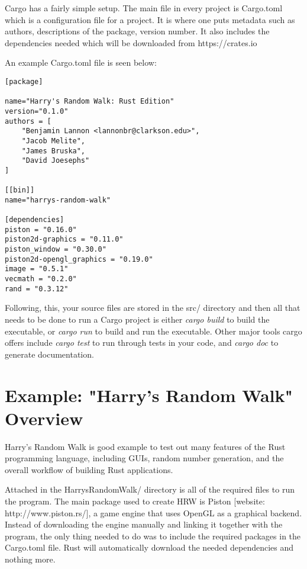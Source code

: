\documentclass{article}
\begin{document}
Cargo has a fairly simple setup. The main file in every project is Cargo.toml which is a configuration file for a project. It is where one puts metadata such as authors, descriptions of the package, version number. It also includes the dependencies needed which will be downloaded from https://crates.io

An example Cargo.toml file is seen below:

\begin{lstlisting}
[package]

name="Harry's Random Walk: Rust Edition"
version="0.1.0"
authors = [
	"Benjamin Lannon <lannonbr@clarkson.edu>",
	"Jacob Melite",
	"James Bruska",
	"David Joesephs"
]

[[bin]]
name="harrys-random-walk"

[dependencies]
piston = "0.16.0"
piston2d-graphics = "0.11.0"
piston_window = "0.30.0"
piston2d-opengl_graphics = "0.19.0"
image = "0.5.1"
vecmath = "0.2.0"
rand = "0.3.12"
\end{lstlisting}

Following, this, your source files are stored in the src/ directory and then all that needs to be done to run a Cargo project is either \emph{cargo build} to build the executable, or \emph{cargo run} to build and run the executable. Other major tools cargo offers include \emph{cargo test} to run through tests in your code, and \emph{cargo doc} to generate documentation.

\section{Example: "Harry's Random Walk" Overview}
Harry's Random Walk is good example to test out many features of the Rust programming language, including GUIs, random number generation, and the overall workflow of building Rust applications.

Attached in the HarrysRandomWalk/ directory is all of the required files to run the program. The main package used to create HRW is Piston [website: http://www.piston.rs/], a game engine that uses OpenGL as a graphical backend. Instead of downloading the engine manually and linking it together with the program, the only thing needed to do was to include the required packages in the Cargo.toml file. Rust will automatically download the needed dependencies and nothing more.
\end{document}
